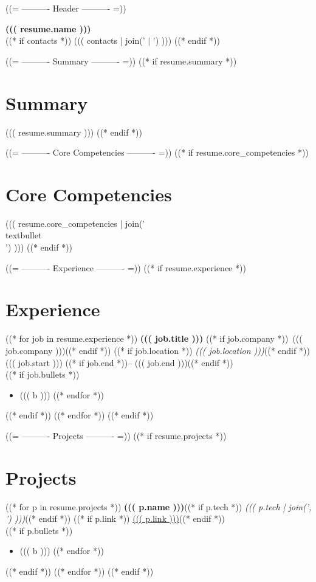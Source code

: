 \documentclass[11pt,a4paper]{article}
\begin{document}
((= ---------- Header ---------- =))
\begin{center}
  {\LARGE\bfseries ((( resume.name )))}\\[2pt]
  ((* if contacts *))
  \small ((( contacts | join('  $|$  ') )))
  ((* endif *))
\end{center}

((= ---------- Summary ---------- =))
((* if resume.summary *))
\section{Summary}
((( resume.summary )))
((* endif *))

((= ---------- Core Competencies ---------- =))
((* if resume.core_competencies *))
\section{Core Competencies}
((( resume.core_competencies | join(' \\textbullet\\ ') )))
((* endif *))

((= ---------- Experience ---------- =))
((* if resume.experience *))
\section{Experience}
((* for job in resume.experience *))
\textbf{((( job.title )))} ((* if job.company *))\textbar\ ((( job.company )))((* endif *))
((* if job.location *)) \textit{((( job.location )))}((* endif *))
\hfill ((( job.start ))) ((* if job.end *))-- ((( job.end )))((* endif *))\\[1pt]
((* if job.bullets *))
\begin{itemize}
((* for b in job.bullets *))
  \item ((( b )))
((* endfor *))
\end{itemize}
((* endif *))
((* endfor *))
((* endif *))

((= ---------- Projects ---------- =))
((* if resume.projects *))
\section{Projects}
((* for p in resume.projects *))
\textbf{((( p.name )))}((* if p.tech *)) \textit{((( p.tech | join(', ') )))}((* endif *))
((* if p.link *)) \hfill \href{((( p.link_raw )))}{((( p.link )))}((* endif *))\\[1pt]
((* if p.bullets *))
\begin{itemize}
((* for b in p.bullets *))
  \item ((( b )))
((* endfor *))
\end{itemize}
((* endif *))
((* endfor *))
((* endif *))
\end{document}
